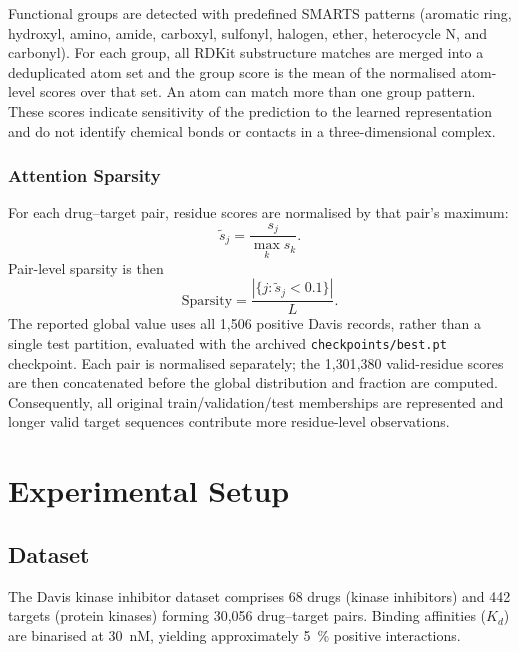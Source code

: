 \documentclass[fleqn,10pt]{wlscirep}
\begin{document}
Functional groups are detected with predefined SMARTS patterns (aromatic ring,
hydroxyl, amino, amide, carboxyl, sulfonyl, halogen, ether, heterocycle N, and
carbonyl). For each group, all RDKit substructure matches are merged into a
deduplicated atom set and the group score is the mean of the normalised
atom-level scores over that set. An atom can match more than one group pattern.
These scores indicate sensitivity of the prediction to the learned
representation and do not identify chemical bonds or contacts in a
three-dimensional complex.
\endgroup

\subsubsection{Attention Sparsity}

\begingroup\color{red}
For each drug--target pair, residue scores are normalised by that pair's maximum:
\begin{equation}
\widetilde{s}_j = \frac{s_j}{\max_k s_k}.
\end{equation}
Pair-level sparsity is then
\begin{equation}
\mathrm{Sparsity} = \frac{|\{j : \widetilde{s}_j < 0.1\}|}{L}.
\end{equation}
The reported global value uses all 1{,}506 positive Davis records, rather than a
single test partition, evaluated with the archived \texttt{checkpoints/best.pt}
checkpoint. Each pair is normalised separately; the 1{,}301{,}380 valid-residue
scores are then concatenated before the global distribution and fraction are
computed. Consequently, all original train/validation/test memberships are
represented and longer valid target sequences contribute more residue-level
observations.
\endgroup

\section{Experimental Setup}
\label{sec:experiments}

\subsection{Dataset}

The Davis kinase inhibitor
dataset\cite{davis2011comprehensive} comprises 68 drugs (kinase inhibitors)
and 442 targets (protein kinases) forming 30{,}056 drug--target pairs.  Binding
affinities ($K_d$) are binarised at \SI{30}{nM}, yielding approximately
\SI{5}{\percent} positive interactions.
\end{document}
